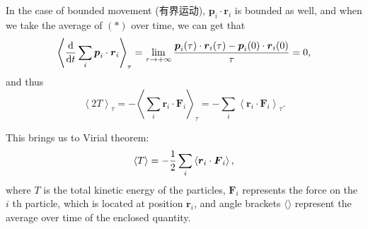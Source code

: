 In the case of bounded movement (有界运动),
\(\boldsymbol p_i \cdot \boldsymbol r_i\) is bounded as well, and when we take the average of \((*)\) over time, we can get that \[\left \langle {\mathrm d \over \mathrm dt} \sum_i \boldsymbol p_i \cdot \boldsymbol r_i \right \rangle_\tau = \lim_{\tau \to + \infty} \frac{\boldsymbol p_i(\tau) \cdot \boldsymbol r_i(\tau) - \boldsymbol p_i(0) \cdot \boldsymbol r_i(0)}{\tau} = 0,\]
and thus
\[\left \langle 2T \right \rangle_\tau = - \left \langle \sum_i \boldsymbol r_i \cdot \boldsymbol F_i \right \rangle_\tau = - \sum_i \left \langle \boldsymbol r_i \cdot \boldsymbol F_i \right \rangle_\tau.\]

This brings us to Virial theorem:
\[\left \langle T \right \rangle = - {1 \over 2} \sum_i \left \langle \boldsymbol r_i \cdot \boldsymbol F_i \right \rangle,\]
where \(T\) is the total kinetic energy of the particles,
\(\boldsymbol F_i\) represents the force on the \(i\) th particle, which
is located at position \(\boldsymbol r_i\), and angle brackets
\(\langle \rangle\) represent the average over time of the enclosed quantity.

